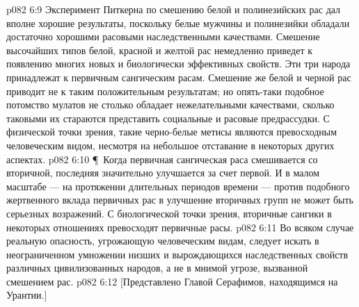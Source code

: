 \vs p082 6:9 Эксперимент Питкерна по смешению белой и полинезийских рас дал вполне хорошие результаты, поскольку белые мужчины и полинезийки обладали достаточно хорошими расовыми наследственными качествами. Смешение высочайших типов белой, красной и желтой рас немедленно приведет к появлению многих новых и биологически эффективных свойств. Эти три народа принадлежат к первичным сангическим расам. Смешение же белой и черной рас приводит не к таким положительным результатам; но опять\hyp{}таки подобное потомство мулатов не столько обладает нежелательными качествами, сколько таковыми их стараются представить социальные и расовые предрассудки. С физической точки зрения, такие черно\hyp{}белые метисы являются превосходным человеческим видом, несмотря на небольшое отставание в некоторых других аспектах.
\vs p082 6:10 \P\ Когда первичная сангическая раса смешивается со вторичной, последняя значительно улучшается за счет первой. И в малом масштабе --- на протяжении длительных периодов времени --- против подобного жертвенного вклада первичных рас в улучшение вторичных групп не может быть серьезных возражений. С биологической точки зрения, вторичные сангики в некоторых отношениях превосходят первичные расы.
\vs p082 6:11 Во всяком случае реальную опасность, угрожающую человеческим видам, следует искать в неограниченном умножении низших и вырождающихся наследственных свойств различных цивилизованных народов, а не в мнимой угрозе, вызванной смешением рас.
\vs p082 6:12 [Представлено Главой Серафимов, находящимся на Урантии.]
